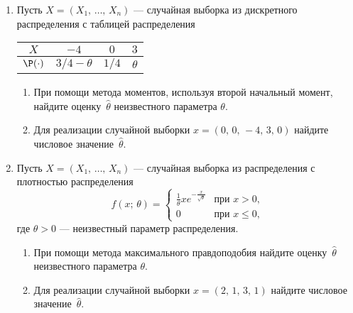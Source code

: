 \begin{enumerate}
\item
Пусть $X = (X_1, \, \ldots, \, X_n)$ — случайная выборка из дискретного распределения с таблицей распределения
\begin{center}
\begin{tabular}{cccc}
\toprule
  $X$                & $-4$            & $0$    & $3$   \\ \midrule
  $\P(\cdot)$   & $3/4 - \theta$  & $1/4$  & $\theta$ \\ \bottomrule
\end{tabular}
\end{center}
\begin{enumerate}
  \item При помощи метода моментов, используя второй начальный момент, найдите оценку~$\hat{\theta}$ неизвестного параметра $\theta$.
  \item Для реализации случайной выборки $x = (0, \, 0, \, -4, \, 3, \, 0)$ найдите числовое значение~$\hat{\theta}$.
\end{enumerate}

\item
Пусть $X = (X_1, \, \ldots, \, X_n)$ — случайная выборка из распределения с плотностью распределения
\[
    f(x; \, \theta) = \left\{
                        \begin{array}{ll}
                          \tfrac{1}{\theta}xe^{-\tfrac{x}{\sqrt{\theta}}} & \text{при $x > 0$,} \\
                          0 & \text{при $x \leq 0$,}
                        \end{array}
                      \right.
\]
где $\theta > 0$ — неизвестный параметр распределения.
\begin{enumerate}
  \item При помощи метода максимального правдоподобия найдите оценку~$\hat{\theta}$ неизвестного параметра $\theta$.
  \item Для реализации случайной выборки $x = (2, \, 1, \, 3, \, 1)$ найдите числовое значение~$\hat{\theta}$.
\end{enumerate}


\end{enumerate}
